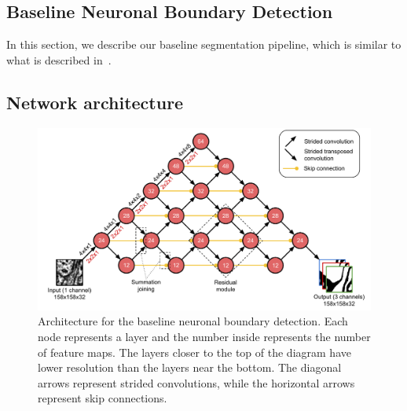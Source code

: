 \documentclass{article}
\begin{document}
\begin{appendices}

\section{Baseline Neuronal Boundary Detection}
\label{appendix:baseline}

In this section, we describe our baseline segmentation pipeline, which is similar to what is described in~\cite{kisuk}.

\subsection{Network architecture}

\begin{figure}[!b]
\centering
\includegraphics[width=1.0\linewidth]{baseline.pdf}
\caption{Architecture for the baseline neuronal boundary detection. Each node represents a layer and the number inside represents the number of feature maps. The layers closer to the top of the diagram have lower resolution than the layers near the bottom. The diagonal arrows represent strided convolutions, while the horizontal arrows represent skip connections.}
\label{fig:boundary_detector}
\end{figure}


\end{appendices}
\end{document}
